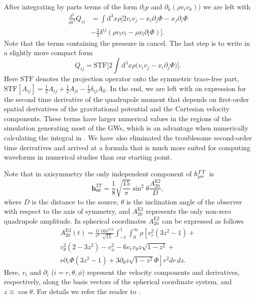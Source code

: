 After integrating by parts terms of the form $\partial_i p$ and $\partial_k (\rho v_i v_k))$
we are left with
\begin{align} \label{eqT:quaddtt3}
\frac{\mathrm{d}^2}{\mathrm{dt}^2} Q_{ij} & = \int \mathrm{d}^3 x \rho \bigg[ 2 v_i v_j  - x_i \partial_j \Phi -  x_j \partial_i \Phi \nonumber \\
&- \frac{2}{3} \delta^{ij} (\rho v_l v_l - \rho x_l \partial_l \Phi)  \bigg]. 
\end{align}
Note that the terms containing the pressure in  cancel. The last step is to write  in a slightly more 
compact form    
\begin{equation} \label{eqT:STFQ}
\ddot{Q}_{ij} =\mathrm{STF} \bigg[2 \int \mathrm{d}^3 x \rho \Big( v_i v_j - x_i \partial_j \Phi \Big) \bigg].
\end{equation}
Here $\mathrm{STF}$ denotes the projection operator
onto the symmetric trace-free part, $\mathrm{STF}[A_{ij}] = \frac{1}{2}A_{ij} + \frac{1}{2}A_{ji} - \frac{1}{3} \delta_{ij} A_{ll} $.
In the end, we are left with an expression for the second time derivative of the quadrupole moment that
depends on first-order spatial derivatives of the gravitational potential and the Cartesian velocity components.
These terms have larger numerical values in the regions of the simulation generating most of the GWs, which is an advantage when numerically calculating the integral in . We have also 
eliminated the troublesome second-order time derivatives and arrived at a formula that is much more suited for 
computing waveforms in numerical studies than our starting point.

Note that in axisymmetry the only independent component of $h_{\mu\nu}^{TT}$ is 
\begin{equation}
\mathbf{h}^{TT}_{\theta \theta} = \frac{1}{8}\sqrt{\frac{15}{\pi}} \sin^2{\theta} \frac{A_{20}^\mathrm{E2}}{D},
\end{equation}
where $D$ is the distance to the source, $\theta$ is the inclination angle of the observer with respect to the
axis of symmetry, and $A_{20}^\mathrm{E2}$ represents the only non-zero quadrupole amplitude.
In spherical coordinates $A_{20}^\mathrm{E2}$ can be expressed as follows
\begin{eqnarray} \label{eq:2dquad}
A_{20}^\mathrm{E2} (t) =  \frac{G}{c^4} \frac{16 \pi^{3/2}}{\sqrt{15}} \int_{-1}^{1}\int^{\infty}_0 \rho \left [ v_r^2(3 z^2 - 1)+ \right. \nonumber \\
v_{\theta}^2(2-3 z^2) - v_{\phi}^2 - 6 v_r v_{\theta} z\sqrt{1-z^2} + \nonumber \\
r \partial_r \Phi (3 z^2 - 1) +\left. 3 \partial_{\theta}z\sqrt{1-z^2} \Phi \right ]r^2 dr \, dz.
\end{eqnarray}
Here, $v_i$ and $\partial_i$ ($i = r, \theta, \phi$) represent the velocity components and derivatives, respectively, along
the basis vectors of the spherical coordinate system, and $z \equiv \cos \theta$.
For details we refer the reader to \cite{mueller_97}.

